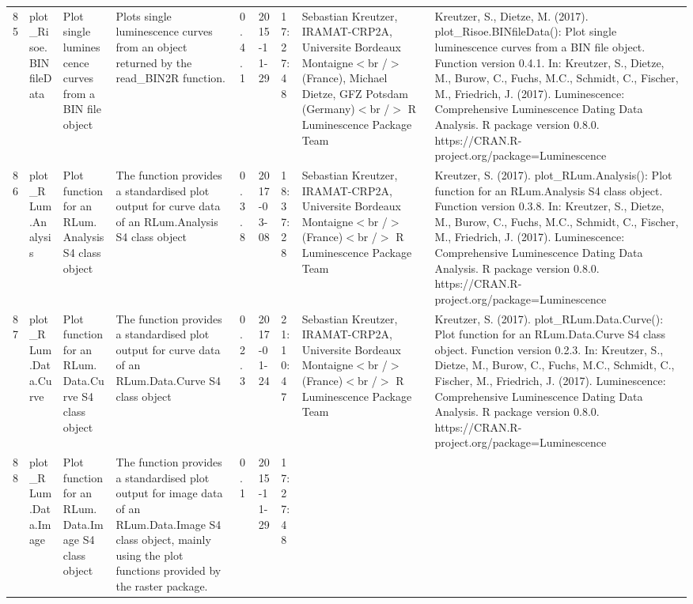 \begin{table}[ht]
\begin{tabular}{rllllllll}
 \\ 
  85 & plot\_Risoe.BINfileData & Plot single luminescence curves from a BIN file object & Plots single luminescence curves from an object returned by the read\_BIN2R  function. & 0.4.1 & 2015-11-29 & 17:27:48
 & Sebastian Kreutzer, IRAMAT-CRP2A, Universite Bordeaux Montaigne$<$br /$>$ (France),  Michael Dietze, GFZ Potsdam (Germany)$<$br /$>$  R Luminescence Package Team & Kreutzer, S., Dietze, M. (2017). plot\_Risoe.BINfileData(): Plot single luminescence curves from a BIN file object. Function version 0.4.1. In: Kreutzer, S., Dietze, M., Burow, C., Fuchs, M.C., Schmidt, C., Fischer, M., Friedrich, J. (2017). Luminescence: Comprehensive Luminescence Dating Data Analysis. R package version 0.8.0. https://CRAN.R-project.org/package=Luminescence
 \\ 
  86 & plot\_RLum.Analysis & Plot function for an RLum.Analysis S4 class object & The function provides a standardised plot output for curve data of an RLum.Analysis S4 class object & 0.3.8 & 2017-03-08 & 18:37:28
 & Sebastian Kreutzer, IRAMAT-CRP2A, Universite Bordeaux Montaigne$<$br /$>$ (France)$<$br /$>$  R Luminescence Package Team & Kreutzer, S. (2017). plot\_RLum.Analysis(): Plot function for an RLum.Analysis S4 class object. Function version 0.3.8. In: Kreutzer, S., Dietze, M., Burow, C., Fuchs, M.C., Schmidt, C., Fischer, M., Friedrich, J. (2017). Luminescence: Comprehensive Luminescence Dating Data Analysis. R package version 0.8.0. https://CRAN.R-project.org/package=Luminescence
 \\ 
  87 & plot\_RLum.Data.Curve & Plot function for an RLum.Data.Curve S4 class object & The function provides a standardised plot output for curve data of an RLum.Data.Curve S4 class object & 0.2.3 & 2017-01-24 & 21:10:47
 & Sebastian Kreutzer, IRAMAT-CRP2A, Universite Bordeaux Montaigne$<$br /$>$ (France)$<$br /$>$  R Luminescence Package Team & Kreutzer, S. (2017). plot\_RLum.Data.Curve(): Plot function for an RLum.Data.Curve S4 class object. Function version 0.2.3. In: Kreutzer, S., Dietze, M., Burow, C., Fuchs, M.C., Schmidt, C., Fischer, M., Friedrich, J. (2017). Luminescence: Comprehensive Luminescence Dating Data Analysis. R package version 0.8.0. https://CRAN.R-project.org/package=Luminescence
 \\ 
  88 & plot\_RLum.Data.Image & Plot function for an  RLum.Data.Image  S4 class object & The function provides a standardised plot output for image data of an RLum.Data.Image S4 class object, mainly using the plot functions provided by the  raster  package. & 0.1 & 2015-11-29 & 17:27:48

\end{tabular}
\end{table}
